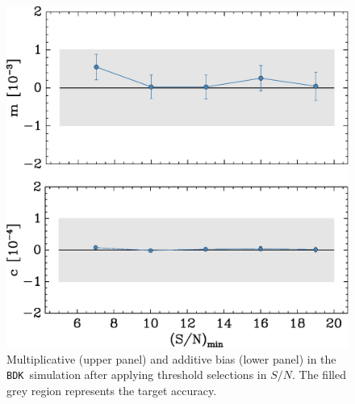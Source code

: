 \documentclass[a4paper,fleqn,usenatbib]{mnras}
\newcommand{\snr}{$S/N$}
\newcommand{\bdsim}{\texttt{BDK}}
\begin{document}

\begin{figure}
    \centering
    \includegraphics[width=\columnwidth]{mc-select-bias-thresh.eps}

    \caption{Multiplicative (upper panel) and
		additive bias (lower panel) in the \bdsim\ simulation after applying
        threshold selections in \snr.   
        The filled grey region represents the target accuracy. } 

\label{fig:s2nthresh}
\end{figure}
\end{document}
